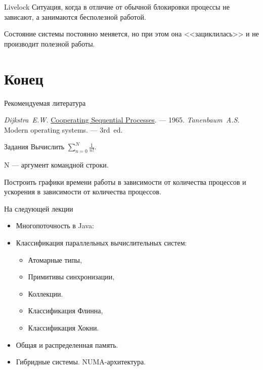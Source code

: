 \begin{frame}{Livelock}
Ситуация, когда в отличие от обычной блокировки процессы не зависают, а занимаются бесполезной работой.
\vspace*{0.5cm}

Состояние системы постоянно меняется, но при этом она <<зациклилась>> и не производит полезной работы.
\end{frame}

\section*{Конец}

\begin{frame}[allowframebreaks]{Рекомендуемая литература}
\begin{thebibliography}{99}
    \bibitem{} \textit{Dijkstra~E.W.}
    \href{http://www.cs.utexas.edu/users/EWD/transcriptions/EWD01xx/EWD123.html}{Cooperating
    Sequential Processes}. --- 1965.
    \bibitem{} \textit{Tanenbaum~A.S.} Modern operating systems. --- 3rd~ed.
\end{thebibliography}
\end{frame}

\ifmipt
\begin{frame}{Задания}
Вычислить $\sum \limits_{n=0}^{N} \frac{1}{n!}$.

N --- аргумент командной строки.

Построить графики времени работы в зависимости от количества процессов и ускорения в зависимости от количества процессов.
\end{frame}
\fi

\begin{frame}{На следующей лекции}
\begin{itemize}
\ifsbertech
    \item Многопоточность в Java:
\fi
\ifmipt
    \item Классификация параллельных вычислительных систем:
\fi
    \begin{itemize}
\ifsbertech
        \item Атомарные типы,
        \item Примитивы синхронизации,
        \item Коллекции.
\fi
\ifmipt
        \item Классификация Флинна,
        \item Классификация Хокни.
\fi
    \end{itemize}
\ifmipt
    \item Общая и распределенная память.
    \item Гибридные системы. NUMA-архитектура.
\fi
\end{itemize}
\end{frame}

